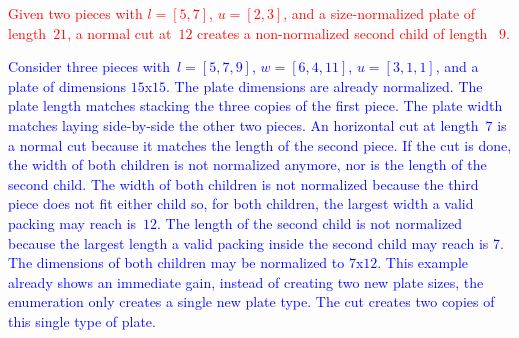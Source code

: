 \documentclass[smallextended]{svjour3}       %
\newif\iffinalversion
\newcommand{\newtext}[1]{\iffinalversion%
#1%
\else%
\textcolor{blue}{#1}%
\fi%
}
\newcommand{\oldtext}[1]{\iffinalversion%
\else%
\textcolor{red}{#1}%
\fi%
}
\begin{document}
\begin{example}\label{ex:renormalization_after_cut}
\oldtext{Given two pieces with \(l = [5, 7]\), \(u = [2, 3]\), and a size-normalized plate of length~\(21\), a normal cut at~\(12\) creates a non-normalized second child of length~ \(9\).}
\newtext{Consider three pieces with~\(l = [5, 7, 9]\), \(w = [6, 4, 11]\), \(u = [3, 1, 1]\), and a plate of dimensions \(15\)x\(15\). The plate dimensions are already normalized. The plate length matches stacking the three copies of the first piece. The plate width matches laying side-by-side the other two pieces. An horizontal cut at length~\(7\) is a normal cut because it matches the length of the second piece. If the cut is done, the width of both children is not normalized anymore, nor is the length of the second child. The width of both children is not normalized because the third piece does not fit either child so, for both children, the largest width a valid packing may reach is~\(12\). The length of the second child is not normalized because the largest length a valid packing inside the second child may reach is 7. The dimensions of both children may be normalized to \(7\)x\(12\). This example already shows an immediate gain, instead of creating two new plate sizes, the enumeration only creates a single new plate type. The cut creates two copies of this single type of plate.}
\end{example}
\end{document}
